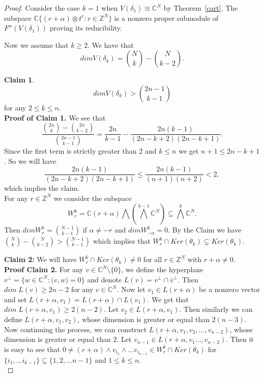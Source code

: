 \documentclass[a4paper,11pt]{amsart}
\numberwithin{equation}{section}
\theoremstyle{plain}
\newcommand{\Z}{\mathbb{Z}}
\newcommand{\C}{\mathbb{C}}
\begin{document}
\begin{proof} Consider the case $k=1$ when $V(\delta_1)\cong \C^N$
 by Theorem~\ref{cart}. The subspace $\C\{(r+\alpha)\otimes t^r:r\in \Z^N\}$ is a nonzero proper submodule of $F^\alpha(V(\delta_1))$ proving its reducibility.

    Now we assume that $k\geq2$. We have that $$dim V(\delta_k)= {{N}\choose{k}}-{N\choose{k-2}}.$$
    
   {\bf Claim 1}.   $$dim V(\delta_k) >
{2n-1\choose{k-1}}$$ for any $2\leq k\leq n$.\\

{\bf Proof of Claim 1.}
   We see that $$\frac{{2n\choose{k}}- {2n\choose{k-2}}}{{2n-1\choose{k-1}}}=\frac{2n}{k-1}-\frac{2n(k-1)}{(2n-k+2)(2n-k+1)}.$$ 
   Since the first term is strictly greater than $2$ and $k\leq n$ we get $n+1\leq 2n-k+1$. So we will have $$\frac{2n(k-1)}{(2n-k+2)(2n-k+1)}\leq \frac{2n(k-1)}{(n+1)(n+2)}<2,$$ which implies the claim.\\
    
    
    
    
    
    
    For any $r\in \Z^N$ we consider the subspace $$W^k_r=\C(r+\alpha)\bigwedge (\bigwedge^{k-1}\C^N)\subseteq \bigwedge^k \C^N.$$ Then $dim W_r^k={N-1\choose{k-1}}$ if $\alpha\neq -r$ and $dim W_{-\alpha}^k=0$. By the Claim we have ${N\choose{k}}-{N\choose{k-2}}>{N-1\choose{k-1}}$ which implies that $W_r^k\cap Ker(\theta_k)\subsetneq Ker(\theta_k)$.

    \medskip

    {\bf Claim 2:} We will have $W_r^k\cap Ker(\theta_k)\neq 0$ for all $r\in \Z^N$ with $r+\alpha \neq 0$.\\

    {\bf Proof Claim 2.} %
        For any $v\in \C^N\setminus\{0\}$, we define the hyperplane $v^\perp=\{w\in \C^N:\bm{(}v,w\bm{)}=0\}$ and denote $L(v)=v^\perp \cap \bar{v}^\perp$. Then $dim \;L(v)\geq 2n-2$ for any $v\in \C^N$. Now let $v_1\in L(r+\alpha)$ be a nonzero vector and set $L(r+\alpha,v_1)=L(r+\alpha)\cap L(v_1)$. We get that $dim\; L(r+\alpha,v_1)\geq 2(n-2)$. Let $v_2\in L(r+\alpha,v_1)$. Then similarly we can define $L(r+\alpha,v_1,v_2)$, whose dimension is greater or equal than $2(n-3)$. Now continuing the process, we can construct $L(r+\alpha,v_1,v_2,\dots, v_{n-2})$, whose dimension is greater or equal than $2$. Let $v_{n-1}\in L(r+\alpha,v_1\dots, v_{n-2})$. Then it is easy to see that $0\neq (r+\alpha)\wedge v_{i_1}\wedge \dots v_{i_{k-1}}\in W_r^k\cap Ker(\theta_k)$ for $\{i_1,\dots i_{k-1}\}\subseteq \{1,2,\dots n-1\}$ and $1\leq k\leq n$.\\ 


\end{proof}
\end{document}
